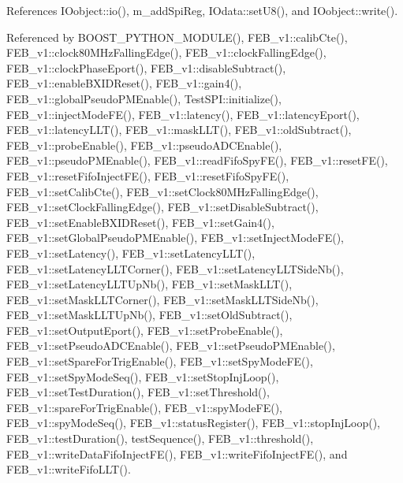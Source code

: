 References I\+Oobject\+::io(), m\+\_\+add\+Spi\+Reg, I\+Odata\+::set\+U8(), and I\+Oobject\+::write().



Referenced by B\+O\+O\+S\+T\+\_\+\+P\+Y\+T\+H\+O\+N\+\_\+\+M\+O\+D\+U\+L\+E(), F\+E\+B\+\_\+v1\+::calib\+Cte(), F\+E\+B\+\_\+v1\+::clock80\+M\+Hz\+Falling\+Edge(), F\+E\+B\+\_\+v1\+::clock\+Falling\+Edge(), F\+E\+B\+\_\+v1\+::clock\+Phase\+Eport(), F\+E\+B\+\_\+v1\+::disable\+Subtract(), F\+E\+B\+\_\+v1\+::enable\+B\+X\+I\+D\+Reset(), F\+E\+B\+\_\+v1\+::gain4(), F\+E\+B\+\_\+v1\+::global\+Pseudo\+P\+M\+Enable(), Test\+S\+P\+I\+::initialize(), F\+E\+B\+\_\+v1\+::inject\+Mode\+F\+E(), F\+E\+B\+\_\+v1\+::latency(), F\+E\+B\+\_\+v1\+::latency\+Eport(), F\+E\+B\+\_\+v1\+::latency\+L\+L\+T(), F\+E\+B\+\_\+v1\+::mask\+L\+L\+T(), F\+E\+B\+\_\+v1\+::old\+Subtract(), F\+E\+B\+\_\+v1\+::probe\+Enable(), F\+E\+B\+\_\+v1\+::pseudo\+A\+D\+C\+Enable(), F\+E\+B\+\_\+v1\+::pseudo\+P\+M\+Enable(), F\+E\+B\+\_\+v1\+::read\+Fifo\+Spy\+F\+E(), F\+E\+B\+\_\+v1\+::reset\+F\+E(), F\+E\+B\+\_\+v1\+::reset\+Fifo\+Inject\+F\+E(), F\+E\+B\+\_\+v1\+::reset\+Fifo\+Spy\+F\+E(), F\+E\+B\+\_\+v1\+::set\+Calib\+Cte(), F\+E\+B\+\_\+v1\+::set\+Clock80\+M\+Hz\+Falling\+Edge(), F\+E\+B\+\_\+v1\+::set\+Clock\+Falling\+Edge(), F\+E\+B\+\_\+v1\+::set\+Disable\+Subtract(), F\+E\+B\+\_\+v1\+::set\+Enable\+B\+X\+I\+D\+Reset(), F\+E\+B\+\_\+v1\+::set\+Gain4(), F\+E\+B\+\_\+v1\+::set\+Global\+Pseudo\+P\+M\+Enable(), F\+E\+B\+\_\+v1\+::set\+Inject\+Mode\+F\+E(), F\+E\+B\+\_\+v1\+::set\+Latency(), F\+E\+B\+\_\+v1\+::set\+Latency\+L\+L\+T(), F\+E\+B\+\_\+v1\+::set\+Latency\+L\+L\+T\+Corner(), F\+E\+B\+\_\+v1\+::set\+Latency\+L\+L\+T\+Side\+Nb(), F\+E\+B\+\_\+v1\+::set\+Latency\+L\+L\+T\+Up\+Nb(), F\+E\+B\+\_\+v1\+::set\+Mask\+L\+L\+T(), F\+E\+B\+\_\+v1\+::set\+Mask\+L\+L\+T\+Corner(), F\+E\+B\+\_\+v1\+::set\+Mask\+L\+L\+T\+Side\+Nb(), F\+E\+B\+\_\+v1\+::set\+Mask\+L\+L\+T\+Up\+Nb(), F\+E\+B\+\_\+v1\+::set\+Old\+Subtract(), F\+E\+B\+\_\+v1\+::set\+Output\+Eport(), F\+E\+B\+\_\+v1\+::set\+Probe\+Enable(), F\+E\+B\+\_\+v1\+::set\+Pseudo\+A\+D\+C\+Enable(), F\+E\+B\+\_\+v1\+::set\+Pseudo\+P\+M\+Enable(), F\+E\+B\+\_\+v1\+::set\+Spare\+For\+Trig\+Enable(), F\+E\+B\+\_\+v1\+::set\+Spy\+Mode\+F\+E(), F\+E\+B\+\_\+v1\+::set\+Spy\+Mode\+Seq(), F\+E\+B\+\_\+v1\+::set\+Stop\+Inj\+Loop(), F\+E\+B\+\_\+v1\+::set\+Test\+Duration(), F\+E\+B\+\_\+v1\+::set\+Threshold(), F\+E\+B\+\_\+v1\+::spare\+For\+Trig\+Enable(), F\+E\+B\+\_\+v1\+::spy\+Mode\+F\+E(), F\+E\+B\+\_\+v1\+::spy\+Mode\+Seq(), F\+E\+B\+\_\+v1\+::status\+Register(), F\+E\+B\+\_\+v1\+::stop\+Inj\+Loop(), F\+E\+B\+\_\+v1\+::test\+Duration(), test\+Sequence(), F\+E\+B\+\_\+v1\+::threshold(), F\+E\+B\+\_\+v1\+::write\+Data\+Fifo\+Inject\+F\+E(), F\+E\+B\+\_\+v1\+::write\+Fifo\+Inject\+F\+E(), and F\+E\+B\+\_\+v1\+::write\+Fifo\+L\+L\+T().


